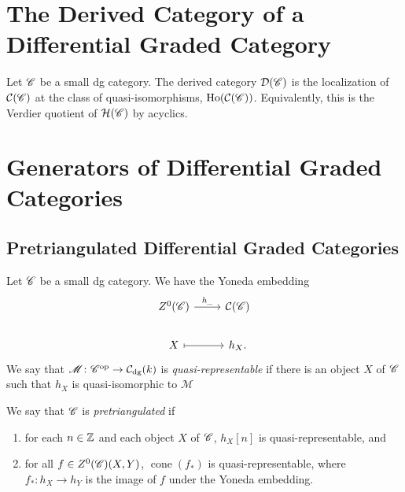 \documentclass[dissertation.tex]{subfiles}
\begin{document}

        \section{The Derived Category of a Differential Graded Category}

        \begin{defn}
          Let $\mathscr{C}$ be a small dg category.
          The derived category $\mathcal{D}(\mathscr{C})$ is the localization of $\mathcal{C}(\mathscr{C})$ at the class of quasi-isomorphisms, $\operatorname{Ho}(\mathcal{C}(\mathscr{C}))$.
          Equivalently, this is the Verdier quotient of $\mathcal{H}(\mathscr{C})$ by acyclics.
        \end{defn}

        \section{Generators of Differential Graded Categories}
        \subsection{Pretriangulated Differential Graded Categories}

        \begin{defn}
          Let $\mathscr{C}$ be a small dg category.
          We have the Yoneda embedding 
          $$\begin{tikzcd}
            Z^0(\CC) \arrow{r}{h_{\_}} & \mathcal{C}(\CC)\\
            X \arrow[mapsto]{r} & h_X.
          \end{tikzcd}$$
          We say that $\mathscr{M} \colon \mathscr{C}^\text{op} \rightarrow \mathcal{C}_\text{dg}(k)$ is {\it quasi-representable} if there is an object $X$ of $\mathscr{C}$ such that $h_X$ is quasi-isomorphic to $\mathscr{M}$
          
          We say that $\mathscr{C}$ is {\it pretriangulated} if
          \begin{enumerate}
          \item
            for each $n \in \mathbb{Z}$ and each object $X$ of $\mathscr{C}$, $h_X[n]$ is quasi-representable, and
          \item
            for all $f \in Z^0(\mathscr{C})(X,Y)$, $\operatorname{cone}(f_*)$ is quasi-representable, where $f_* : h_X \rightarrow h_Y$ is the image of $f$ under the Yoneda embedding.
          \end{enumerate}
        \end{defn}
\end{document}

